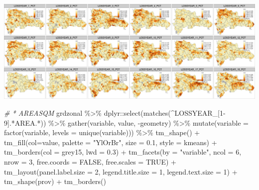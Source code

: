 \documentclass[10pt,landscape,a3paper]{article}
\newenvironment{Shaded}{\begin{snugshade}}{\end{snugshade}}
\newcommand{\AttributeTok}[1]{\textcolor[rgb]{0.77,0.63,0.00}{#1}}
\newcommand{\CommentTok}[1]{\textcolor[rgb]{0.56,0.35,0.01}{\textit{#1}}}
\newcommand{\ConstantTok}[1]{\textcolor[rgb]{0.00,0.00,0.00}{#1}}
\newcommand{\DecValTok}[1]{\textcolor[rgb]{0.00,0.00,0.81}{#1}}
\newcommand{\FloatTok}[1]{\textcolor[rgb]{0.00,0.00,0.81}{#1}}
\newcommand{\FunctionTok}[1]{\textcolor[rgb]{0.00,0.00,0.00}{#1}}
\newcommand{\NormalTok}[1]{#1}
\newcommand{\SpecialCharTok}[1]{\textcolor[rgb]{0.00,0.00,0.00}{#1}}
\newcommand{\StringTok}[1]{\textcolor[rgb]{0.31,0.60,0.02}{#1}}
\begin{document}
\begin{center}\includegraphics{img/zonal-long-term-grid-3} \end{center}

\begin{Shaded}
\begin{Highlighting}[]
\CommentTok{\# * AREASQM}
\NormalTok{grdzonal }\SpecialCharTok{\%\textgreater{}\%}\NormalTok{ dplyr}\SpecialCharTok{::}\FunctionTok{select}\NormalTok{(}\FunctionTok{matches}\NormalTok{(}\StringTok{\textquotesingle{}\^{}LOSSYEAR\_[1{-}9].*AREA.*\textquotesingle{}}\NormalTok{)) }\SpecialCharTok{\%\textgreater{}\%}
  \FunctionTok{gather}\NormalTok{(variable, value, }\SpecialCharTok{{-}}\NormalTok{geometry) }\SpecialCharTok{\%\textgreater{}\%}
  \FunctionTok{mutate}\NormalTok{(}\AttributeTok{variable =} \FunctionTok{factor}\NormalTok{(variable, }\AttributeTok{levels =} \FunctionTok{unique}\NormalTok{(variable))) }\SpecialCharTok{\%\textgreater{}\%} 
  \FunctionTok{tm\_shape}\NormalTok{() }\SpecialCharTok{+}
  \FunctionTok{tm\_fill}\NormalTok{(}\AttributeTok{col=}\StringTok{\textquotesingle{}value\textquotesingle{}}\NormalTok{, }\AttributeTok{palette =} \StringTok{"YlOrBr"}\NormalTok{, }\AttributeTok{size =} \FloatTok{0.1}\NormalTok{, }\AttributeTok{style =} \StringTok{\textquotesingle{}kmeans\textquotesingle{}}\NormalTok{) }\SpecialCharTok{+}
  \FunctionTok{tm\_borders}\NormalTok{(}\AttributeTok{col =} \StringTok{\textquotesingle{}grey15\textquotesingle{}}\NormalTok{, }\AttributeTok{lwd =} \FloatTok{0.3}\NormalTok{) }\SpecialCharTok{+}
  \FunctionTok{tm\_facets}\NormalTok{(}\AttributeTok{by =} \StringTok{"variable"}\NormalTok{, }\AttributeTok{ncol =} \DecValTok{6}\NormalTok{, }\AttributeTok{nrow =} \DecValTok{3}\NormalTok{, }\AttributeTok{free.coords =} \ConstantTok{FALSE}\NormalTok{, }\AttributeTok{free.scales =} \ConstantTok{TRUE}\NormalTok{) }\SpecialCharTok{+}
  \FunctionTok{tm\_layout}\NormalTok{(}\AttributeTok{panel.label.size =} \DecValTok{2}\NormalTok{, }\AttributeTok{legend.title.size =} \DecValTok{1}\NormalTok{, }\AttributeTok{legend.text.size =} \DecValTok{1}\NormalTok{) }\SpecialCharTok{+}
  \FunctionTok{tm\_shape}\NormalTok{(prov) }\SpecialCharTok{+} \FunctionTok{tm\_borders}\NormalTok{()}
\end{Highlighting}
\end{Shaded}
\end{document}
